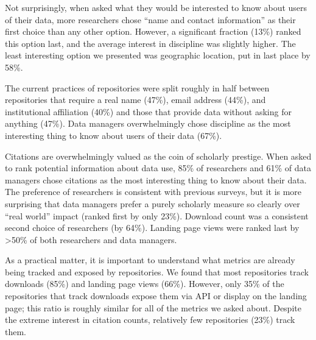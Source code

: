 \documentclass[english]{article}
\begin{document}

Not surprisingly, when asked what they would be interested to know about users of their data, more researchers chose ``name and contact information'' as their first choice than any other option.
However, a significant fraction (13\%) ranked this option last, and the average interest in discipline was slightly higher.
The least interesting option we presented was geographic location, put in last place by 58\%.

The current practices of repositories were split roughly in half between repositories that require a real name (47\%), email address (44\%), and institutional affiliation (40\%) and those that provide data without asking for anything (47\%).
Data managers overwhelmingly chose discipline as the most interesting thing to know about users of their data (67\%).


Citations are overwhelmingly valued as the coin of scholarly prestige. 
When asked to rank potential information about data use, 85\% of researchers and 61\% of data managers chose citations as the most interesting thing to know about their data. 
The preference of researchers is consistent with previous surveys\cite{@kratz_researcher_2015}, but it is more surprising that data managers prefer a purely scholarly measure so clearly over ``real world'' impact (ranked first by only 23\%). 
Download count was a consistent second choice of researchers (by 64\%). 
Landing page views were ranked last by >50\% of both researchers and data managers.

As a practical matter, it is important to understand what metrics are already being tracked and exposed by repositories. 
We found that most repositories track downloads (85\%) and landing page views (66\%). 
However, only 35\% of the repositories that track downloads expose them via API or display on the landing page; this ratio is roughly similar for all of the metrics we asked about. 
Despite the extreme interest in citation counts, relatively few repositories (23\%) track them. 

\end{document}
